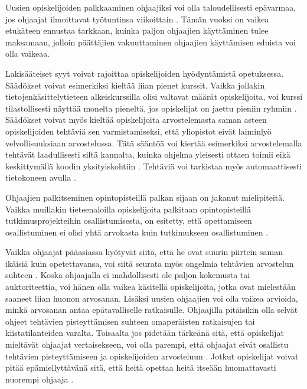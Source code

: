 \documentclass[finnish]{tktltiki2}
\theoremstyle{definition}
\theoremstyle{remark}
\begin{document}
Uusien opiskelijoiden palkkaaminen ohjaajiksi voi olla taloudellisesti epävarmaa, jos ohjaajat ilmoittavat työtuntinsa viikoittain \cite{Reges03}. Tämän vuoksi on vaikea etukäteen ennustaa tarkkaan, kuinka paljon ohjaajien käyttäminen tulee maksamaan, jolloin päättäjien vakuuttaminen ohjaajien käyttämisen eduista voi olla vaikeaa. \par

Lakisääteiset syyt voivat rajoittaa opiskelijoiden hyödyntämistä opetuksessa. Säädökset voivat esimerkiksi kieltää liian pienet kurssit. Vaikka jollakin tietojenkäsittelytieteen alkeiskurssilla olisi valtavat määrät opiskelijoita, voi kurssi tilastollisesti näyttää monelta pieneltä, jos opiskelijat on jaettu pieniin ryhmiin \cite{Reges03}. Säädökset voivat myös kieltää opiskelijoita arvostelemasta saman asteen opiskelijoiden tehtäviä sen varmistamiseksi, että yliopistot eivät laiminlyö velvollisuuksiaan arvostelussa. Tätä sääntöä voi kiertää esimerkiksi arvostelemalla tehtävät laadullisesti siltä kannalta, kuinka ohjelma yleisesti ottaen toimii eikä keskittymällä koodin yksityiskohtiin \cite{Dickson11}. Tehtäviä voi tarkistaa myös automaattisesti tietokoneen avulla \cite{Vihavainen}. \par

Ohjaajien palkitseminen opintopisteillä palkan sijaan on jakanut mielipiteitä. Vaikka muillakin tieteenaloilla opiskelijoita palkitaan opintopisteillä tutkimusprojekteihin osallistumisesta, on esitetty, että opettamiseen osallistuminen ei olisi yhtä arvokasta kuin tutkimukseen osallistuminen \cite{Reges88}. \par

Vaikka ohjaajat pääasiassa hyötyvät siitä, että he ovat suurin piirtein saman ikäisiä kuin opetettavansa, voi siitä seurata myös ongelmia tehtävien arvostelun suhteen \cite{Roberts95}. Koska ohjaajalla ei mahdollisesti ole paljon kokemusta tai auktoriteettia, voi hänen olla vaikea käsitellä opiskelijoita, jotka ovat mielestään saaneet liian huonon arvosanan. Lisäksi uusien ohjaajien voi olla vaikea arvioida, minkä arvosanan antaa epätavalliselle ratkaisulle. Ohjaajilla pitäisikin olla selvät ohjeet tehtävien pisteyttämisen suhteen omaperäisten ratkaisujen tai kiistatilanteiden varalta. Toisaalta jos pidetään tärkeänä sitä, että opiskelijat mieltävät ohjaajat vertaisekseen, voi olla parempi, että ohjaajat eivät osallistu tehtävien pisteyttämiseen ja opiskelijoiden arvosteluun \cite{Morgan02}. Jotkut opiskelijat voivat pitää epämiellyttävänä sitä, että heitä opettaa heitä itseään huomattavasti nuorempi ohjaaja \cite{Sperry08}. \par
\end{document}
